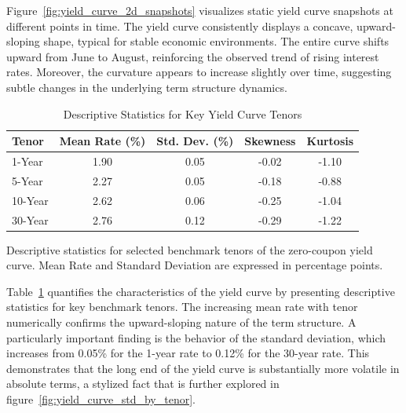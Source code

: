 Figure~\ref{fig:yield_curve_2d_snapshots} visualizes static yield curve snapshots at different points in time. The yield curve consistently displays a concave, upward-sloping shape, typical for stable economic environments. The entire curve shifts upward from June to August, reinforcing the observed trend of rising interest rates. Moreover, the curvature appears to increase slightly over time, suggesting subtle changes in the underlying term structure dynamics.

\begin{table}[H]
	\centering
	\begin{threeparttable}
		\caption{Descriptive Statistics for Key Yield Curve Tenors}
		\label{tab:yield_curve_summary}
		\begin{tabular}{lcccc}
			\toprule
			\textbf{Tenor} & \textbf{Mean Rate (\%)} & \textbf{Std. Dev. (\%)} & \textbf{Skewness} & \textbf{Kurtosis} \\
			\midrule
			1-Year         & 1.90                    & 0.05                    & -0.02             & -1.10             \\
			5-Year         & 2.27                    & 0.05                    & -0.18             & -0.88             \\
			10-Year        & 2.62                    & 0.06                    & -0.25             & -1.04             \\
			30-Year        & 2.76                    & 0.12                    & -0.29             & -1.22             \\
			\bottomrule
		\end{tabular}
		\begin{tablenotes}
			\footnotesize
			\item  Descriptive statistics for selected benchmark tenors of the zero-coupon yield curve. Mean Rate and Standard Deviation are expressed in percentage points.
		\end{tablenotes}
	\end{threeparttable}
\end{table}

Table~\ref{tab:yield_curve_summary} quantifies the characteristics of the yield curve by presenting descriptive statistics for key benchmark tenors. The increasing mean rate with tenor numerically confirms the upward-sloping nature of the term structure. A particularly important finding is the behavior of the standard deviation, which increases from 0.05\% for the 1-year rate to 0.12\% for the 30-year rate. This demonstrates that the long end of the yield curve is substantially more volatile in absolute terms, a stylized fact that is further explored in figure~\ref{fig:yield_curve_std_by_tenor}.

